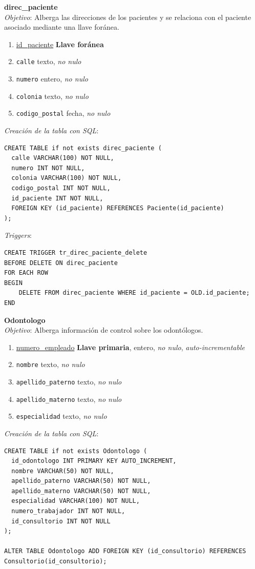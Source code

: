 \documentclass[a4paper,12pt]{article}
\begin{document}
\textbf{direc\_paciente} \\ \emph{Objetivo}: Alberga las direcciones de los pacientes y se relaciona con el paciente asociado mediante una llave foránea.
\begin{enumerate}
	\item \underline{id\_paciente} \textbf{Llave foránea}
	\item \texttt{calle} texto, \emph{no nulo}
	\item \texttt{numero} entero, \emph{no nulo}
	\item \texttt{colonia} texto, \emph{no nulo}
	\item \texttt{codigo\_postal} fecha, \emph{no nulo}
\end{enumerate}

\emph{Creación de la tabla con SQL}: 
\begin{verbatim}
CREATE TABLE if not exists direc_paciente (
  calle VARCHAR(100) NOT NULL,
  numero INT NOT NULL,
  colonia VARCHAR(100) NOT NULL,
  codigo_postal INT NOT NULL,
  id_paciente INT NOT NULL,
  FOREIGN KEY (id_paciente) REFERENCES Paciente(id_paciente)
);
\end{verbatim}

\emph{Triggers}: 

\begin{verbatim}
CREATE TRIGGER tr_direc_paciente_delete
BEFORE DELETE ON direc_paciente
FOR EACH ROW
BEGIN
    DELETE FROM direc_paciente WHERE id_paciente = OLD.id_paciente;
END
\end{verbatim}


\textbf{Odontologo} \\ \emph{Objetivo}: Alberga información de control sobre los odontólogos.
\begin{enumerate}
	\item \underline{numero\_empleado} \textbf{Llave primaria}, entero, \emph{no nulo}, \textit{auto-incrementable}
	\item \texttt{nombre} texto, \emph{no nulo}
	\item \texttt{apellido\_paterno} texto, \emph{no nulo}
	\item \texttt{apellido\_materno} texto, \emph{no nulo}
	\item \texttt{especialidad} texto, \emph{no nulo}
\end{enumerate}

\emph{Creación de la tabla con SQL}: 
\begin{verbatim}
CREATE TABLE if not exists Odontologo (
  id_odontologo INT PRIMARY KEY AUTO_INCREMENT,
  nombre VARCHAR(50) NOT NULL,
  apellido_paterno VARCHAR(50) NOT NULL,
  apellido_materno VARCHAR(50) NOT NULL,
  especialidad VARCHAR(100) NOT NULL,
  numero_trabajador INT NOT NULL,
  id_consultorio INT NOT NULL
);

ALTER TABLE Odontologo ADD FOREIGN KEY (id_consultorio) REFERENCES Consultorio(id_consultorio);
\end{verbatim}
\end{document}
